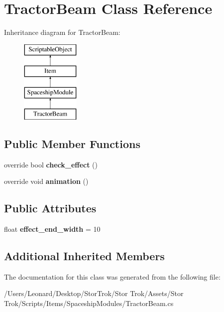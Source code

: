 \hypertarget{class_tractor_beam}{}\section{Tractor\+Beam Class Reference}
\label{class_tractor_beam}
Inheritance diagram for Tractor\+Beam\+:\begin{figure}[H]
\begin{center}
\leavevmode
\includegraphics[height=4.000000cm]{class_tractor_beam}
\end{center}
\end{figure}
\subsection*{Public Member Functions}
\begin{DoxyCompactItemize}
\item 
\mbox{\label{class_tractor_beam_a1d9f560f0b13da7cf09b5065b7c0970f}} 
override bool {\bfseries check\+\_\+effect} ()
\item 
\mbox{\label{class_tractor_beam_ab07d35d58e3871005861395553284004}} 
override void {\bfseries animation} ()
\end{DoxyCompactItemize}
\subsection*{Public Attributes}
\begin{DoxyCompactItemize}
\item 
\mbox{\label{class_tractor_beam_a133c765a5233a6eda511451484741184}} 
float {\bfseries effect\+\_\+end\+\_\+width} = 10
\end{DoxyCompactItemize}
\subsection*{Additional Inherited Members}


The documentation for this class was generated from the following file\+:\begin{DoxyCompactItemize}
\item 
/\+Users/\+Leonard/\+Desktop/\+Stor\+Trok/\+Stor Trok/\+Assets/\+Stor Trok/\+Scripts/\+Items/\+Spaceship\+Modules/Tractor\+Beam.\+cs\end{DoxyCompactItemize}
